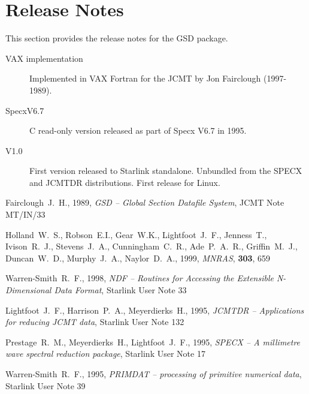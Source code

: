 \documentclass[twoside,11pt]{article}
\newcommand{\xref}[3]{#1}
\renewcommand{\_}{\texttt{\symbol{95}}}
\begin{document}
\section{Release Notes}

This section provides the release notes for the GSD package.

\begin{description}
\item[VAX implementation] \mbox{}

Implemented in VAX Fortran for the JCMT by Jon Fairclough (1997-1989).

\item[SpecxV6.7] \mbox{}

C read-only version released as part of Specx V6.7 in 1995.

\item[V1.0] \mbox{}

First version released to Starlink standalone. Unbundled from the
SPECX and JCMTDR distributions. First release for Linux.

\end{description}

\begin{thebibliography}{}

Fairclough~J.~H., 1989, {\it GSD -- Global Section Datafile System}, 
JCMT Note MT/IN/33

Holland~W.~S., Robson~E.I., Gear~W.K., Lightfoot~J.~F., Jenness~T.,
Ivison~R.~J., Stevens~J.~A., Cunningham~C.~R., Ade~P.~A.~R.,
Griffin~M.~J., Duncan~W.~D., Murphy~J.~A., Naylor~D.~A., 1999,
\textit{MNRAS}, \textbf{303}, 659

Warren-Smith~R.~F., 1998, {\it NDF -- Routines for Accessing the Extensible
N-Dimensional Data Format}, \xref{Starlink User Note 33}{sun33}{}

Lightfoot~J.~F., Harrison~P.~A., Meyerdierks~H., 1995, 
{\it JCMTDR -- Applications for reducing JCMT data},
\xref{Starlink User Note 132}{sun132}{}

Prestage~R.~M., Meyerdierks~H., Lightfoot~J.~F., 1995, {\it SPECX -- A
millimetre wave spectral reduction package},
\xref{Starlink User Note 17}{sun17}{}

Warren-Smith~R.~F., 1995, {\it PRIMDAT -- processing of primitive numerical
data}, \xref{Starlink User Note 39}{sun39}{}

\end{thebibliography}
\end{document}
